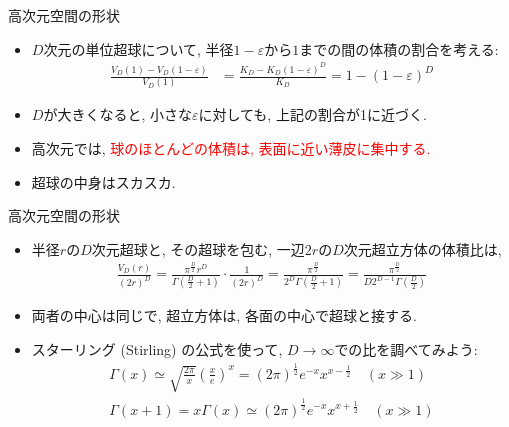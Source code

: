\documentclass[dvipdfmx,notheorems,t]{beamer}
\begin{document}
\begin{frame}{高次元空間の形状}
\begin{itemize}
  \item $D$次元の単位超球について, 半径$1 - \varepsilon$から$1$までの間の体積の割合を考える:
  \begin{align*}
    \frac{V_D(1) - V_D(1 - \varepsilon)}{V_D(1)}
      &= \frac{K_D - K_D (1 - \varepsilon)^D}{K_D}
      = 1 - (1 - \varepsilon)^D
  \end{align*}

  \item $D$が大きくなると, 小さな$\varepsilon$に対しても, 上記の割合が1に近づく.
  \item 高次元では, \textcolor{red}{球のほとんどの体積は, 表面に近い薄皮に集中する.}
  \item 超球の中身はスカスカ.
\end{itemize}
\end{frame}

\begin{frame}{高次元空間の形状}
\begin{itemize}
  \item 半径$r$の$D$次元超球と, その超球を包む, 一辺$2r$の$D$次元超立方体の体積比は,
  \begin{align*}
    \frac{V_D(r)}{(2r)^D} = \frac{\pi^\frac{D}{2} r^D}{\Gamma \left( \frac{D}{2} + 1 \right)} \cdot \frac{1}{(2r)^D}
      = \frac{\pi^\frac{D}{2}}{2^D \Gamma \left( \frac{D}{2} + 1 \right)}
      = \frac{\pi^\frac{D}{2}}{D 2^{D - 1} \Gamma \left( \frac{D}{2} \right)}
  \end{align*}

  \item 両者の中心は同じで, 超立方体は, 各面の中心で超球と接する.
  \item スターリング (Stirling) の公式を使って, $D \to \infty$での比を調べてみよう:
  \begin{gather*}
    \Gamma(x) \simeq \sqrt{\frac{2\pi}{x}} \left( \frac{x}{e} \right)^x
      = (2\pi)^\frac{1}{2} e^{-x} x^{x - \frac{1}{2}} \quad (x \gg 1) \\
    \Gamma(x + 1) = x \Gamma(x) \simeq (2\pi)^\frac{1}{2} e^{-x} x^{x + \frac{1}{2}} \quad (x \gg 1)
  \end{gather*}
\end{itemize}
\end{frame}
\end{document}

